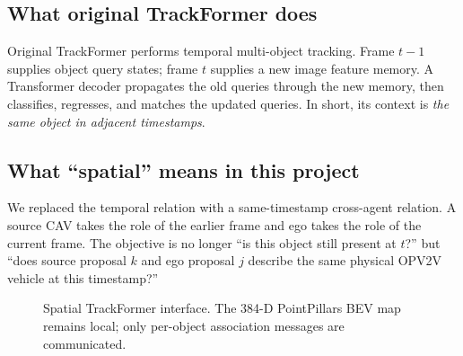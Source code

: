\documentclass[11pt]{article}
\begin{document}
\subsection{What original TrackFormer does}

Original TrackFormer performs temporal multi-object tracking. Frame $t-1$ supplies object query states; frame $t$ supplies a new image feature memory. A Transformer decoder propagates the old queries through the new memory, then classifies, regresses, and matches the updated queries. In short, its context is \emph{the same object in adjacent timestamps}.

\subsection{What ``spatial'' means in this project}

We replaced the temporal relation with a same-timestamp cross-agent relation. A source CAV takes the role of the earlier frame and ego takes the role of the current frame. The objective is no longer ``is this object still present at $t$?'' but ``does source proposal $k$ and ego proposal $j$ describe the same physical OPV2V vehicle at this timestamp?''

\begin{figure}[h]
\centering
{}
\caption{Spatial TrackFormer interface. The 384-D PointPillars BEV map remains local; only per-object association messages are communicated.}
\end{figure}
\end{document}
